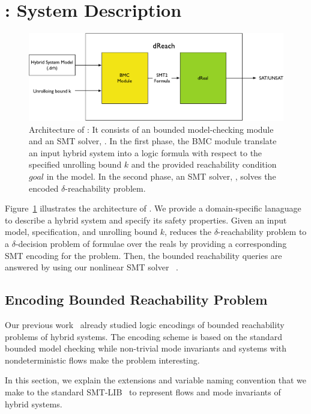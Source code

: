 \section{\dReach{}: System Description}\label{sec:system}
\begin{figure}
  \centering
  \includegraphics[width=\textwidth]{images/dReach}
  \caption{Architecture of \dReach{}: It consists of an bounded
    model-checking module and an SMT solver, \dReal{}. In the first
    phase, the BMC module translate an input hybrid system into a
    logic formula with respect to the specified unrolling bound $k$
    and the provided reachability condition $\textit{goal}$ in the
    model. In the second phase, an SMT solver, \dReal{}, solves the
    encoded $\delta$-reachability problem.}
  \label{fig:system-description}
\end{figure}

Figure~\ref{fig:system-description} illustrates the architecture of
\dReach{}. We provide a domain-specific lanaguage to describe a hybrid
system and specify its safety properties. Given an input model,
specification, and unrolling bound $k$, \dReach{} reduces the
$\delta$-reachability problem to a $\delta$-decision problem of
formulae over the reals by providing a corresponding SMT encoding for
the problem. Then, the bounded reachability queries are answered by
using our nonlinear SMT solver \dReal{}~\cite{DBLP:conf/cade/GaoKC13}.

\subsection{Encoding Bounded Reachability Problem}

Our previous work~\cite{DBLP:journals/corr/GaoKCC14} already studied
logic encodings of bounded reachability problems of hybrid
systems. The encoding scheme is based on the standard bounded model
checking while non-trivial mode invariants and systems with
nondeterministic flows make the problem interesting.

In this section, we explain the extensions and variable naming
convention that we make to the standard SMT-LIB~\cite{BarST-SMT-10} to
represent flows and mode invariants of hybrid systems.

